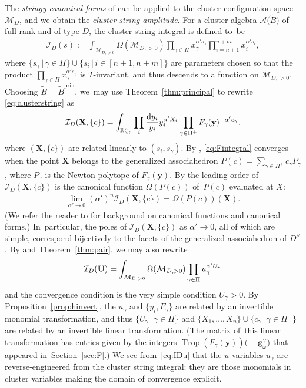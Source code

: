 \documentclass[10pt,a4paper]{amsart}
\def\R{{\mathbb R}}
\def\A{{\mathcal{A}}}
\def\prin{{\operatorname{prin}}}
\def\tB{{\tilde B}}
\def\I{{\mathcal{I}}}
\def\M{{\mathcal{M}}}
\def\tB{{\tilde B}}
\def\y{{\mathbf y}}
\def\X{{\mathbf X}}
\def\Trop{\operatorname{Trop}}
\def\g{{\mathbf g}}
\numberwithin{equation}{section}
\begin{document}
\bigskip{} %
The \emph{stringy canonical forms} of \cite{AHL} can be applied to the cluster configuration space $\M_D$, and we obtain the \emph{cluster string amplitude}.
For a cluster algebra $\A\big(\tB\big)$ of full rank and of type $D$, the cluster string integral is defined to~be
\begin{gather}\label{eq:clusterstring}
\I_D(s):= \int_{\M_{D,>0}} \Omega(\M_{D,>0}) \prod_{\gamma \in \Pi} x_\gamma^{\alpha' s_\gamma}\prod_{i=n+1}^{n+m} x_i^{\alpha' s_i},
\end{gather}
where $\{s_\gamma \,|\, \gamma \in \Pi\} \cup \{s_i \,|\, i \in [n+1,n+m]\}$
are parameters chosen so that the product $\prod_{\gamma \in \Pi} x_\gamma^{\alpha' s_\gamma}$
is $T$-invariant, and thus descends to a function on $\M_{D,>0}$. Choosing $\tB = \tB^\prin$, we~may use Theorem~\ref{thm:principal} to rewrite \eqref{eq:clusterstring} as
\begin{gather}\label{eq:Fintegral}
\I_D(\X,\{c\}) = \int_{\R_{>0}^n} \prod_i \frac{{\rm d}y_i}{y_i} y_i^{\alpha' X_i} \prod_{\gamma \in \Pi^+} F_\gamma(\y)^{-\alpha' c_\gamma},
\end{gather}
where $(\X,\{c\})$ are related linearly to $(s_i,s_\gamma)$. By \cite[Claim 2]{AHL}, \eqref{eq:Fintegral} converges when the point $\X$ belongs to the generalized associahedron $P(c)= \sum_{\gamma \in \Pi^+} c_\gamma P_\gamma$, where $P_\gamma$ is the Newton polytope of $F_\gamma(\y)$. By \cite[Claim 2]{AHL} the leading order of $\I_D(\X,\{c\})$ is the canonical function $\Omega(P(c))$ of~$P(c)$ evaluated at $X$:
\begin{gather*}
\lim_{\alpha' \to 0} (\alpha')^n \I_D(\X,\{c\}) = \underline{\Omega}(P(c))(\X).
\end{gather*}
(We refer the reader to \cite{ABL, AHL} for background on canonical functions and canonical forms.)
In~particular, the poles of $\I_D(\X,\{c\})$ as $\alpha' \to 0$, all of which are simple, correspond bijectively to the facets of the generalized associahedron of $D^\vee$. By \cite[Section~9]{AHL} and Theorem~\ref{thm:pair}, we may also rewrite
\begin{gather} \label{eq:IDu}
\I_D({\bf U}) = \int_{\M_{D,>0}} \Omega(\M_{D,>0}) \prod_{\gamma \in \Pi} u_\gamma^{\alpha'U_\gamma}
\end{gather}
and the convergence condition is the very simple condition $U_\gamma >0$. By Proposition~\ref{prop:hinvert}, the $u_\gamma$ and $\{y_i, F_\gamma\}$ are related by an invertible monomial transformation, and thus $\{U_\gamma \,|\, \gamma \in \Pi\}$ and $\{X_1,\dots,X_n\} \cup \{c_\gamma \,|\, \gamma \in \Pi^+\}$ are related by an invertible linear transformation. (The matrix of~this linear transformation has entries given by the integers $\Trop(F_\gamma(\y))\big({-}\g^\vee_\omega\big)$ that appeared in~Section~\ref{sec:F}.) We see from~\eqref{eq:IDu} that the $u$-variables $u_\gamma$ are reverse-engineered from the cluster string integral: they are those monomials in cluster variables making the domain of convergence explicit.
\end{document}
